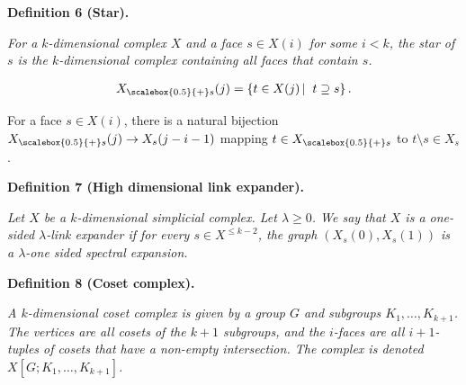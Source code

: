 

\par\medskip\noindent\textbf{
\textbf{Definition 6}\textbf{ }(Star)\textbf{.}
}\par



\emph{For a $k$-dimensional complex $X$ and a face $s\in X(i)$ for some $i<k$, the star of $s$ is the $k$-dimensional complex containing all faces that contain $s$.}\par


\[\begin{gathered}
{X}_{\scalebox{0.5}{+}s}(j)=\left\{t\in X(j)\left|\;\vphantom{t\in X(j)t\supseteq s}\right.t\supseteq s\right\}.
\end{gathered}\]






For a face $s\in X(i)$, there is a natural bijection ${X}_{\scalebox{0.5}{+}s}(j)\to X_{s}(j-i-1)$ mapping $t\in{X}_{\scalebox{0.5}{+}s}$ to $t\setminus s\in X_{s}$.\par





\par\medskip\noindent\textbf{
\textbf{Definition 7}\textbf{ }(High dimensional link expander)\textbf{.}
}\par



\emph{Let $X$ be a $k$-dimensional simplicial complex. Let $\lambda\geq 0$. We say that $X$ is a one-sided $\lambda$-link expander if for every $s\in X^{\leq k-2}$, the graph $(X_{s}(0),X_{s}(1))$ is a $\lambda$-one sided spectral expansion.}\par







\par\medskip\noindent\textbf{
\textbf{Definition 8}\textbf{ }(Coset complex)\textbf{.}
}\par



\emph{A $k$-dimensional coset complex is given by a group $G$ and subgroups $K_{1},\ldots,K_{k+1}$. The vertices are all cosets of the $k+1$ subgroups, and the $i$-faces are all $i+1$-tuples of cosets that have a non-empty intersection. The complex is denoted
$X[G;K_{1},\ldots,K_{k+1}]$.}\par



